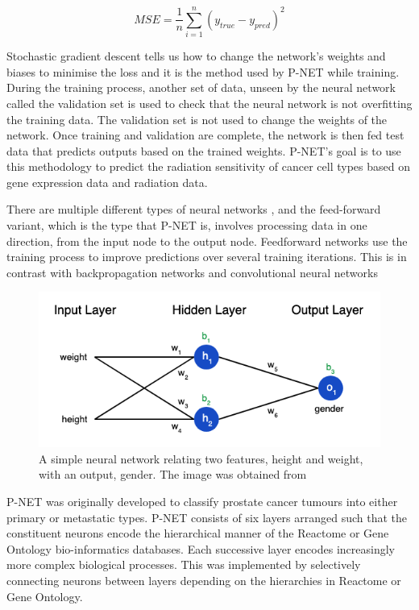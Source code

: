 \documentclass[NOTE, disdraft=true, UKenglish]{\DISCDTLATEXPATH UCLCDTDISdoc}
\begin{document}
\begin{equation}
    MSE = \frac{1}{n} \sum_{i=1}^{n} (y_{true} - y_{pred})^{2}
    \label{eq:mse}
\end{equation}

Stochastic gradient descent \cite{noauthor_what_nodate, elmarakeby_biologically_2021} tells us how to change the network's weights and biases to minimise the loss and it is the method used by P-NET while training. During the training process, another set of data, unseen by the neural network called the validation set is used to check that the neural network is not overfitting the training data. The validation set is not used to change the weights of the network. Once training and validation are complete, the network is then fed test data that predicts outputs based on the trained weights. P-NET's goal is to use this methodology to predict the radiation sensitivity of cancer cell types based on gene expression data and radiation data.

There are multiple different types of neural networks \cite{noauthor_what_nodate}, and the feed-forward variant, which is the type that P-NET is, involves processing data in one direction, from the input node to the output node. Feedforward networks use the training process to improve predictions over several training iterations. This is in contrast with backpropagation networks and convolutional neural networks

\begin{figure}
    \centering
    \includegraphics[width=\linewidth]{Figures/basicNN2.png}
    \caption{A simple neural network relating two features, height and weight, with an output, gender. The image was obtained from \cite{noauthor_machine_nodate}}
    \label{fig:basicNN}
\end{figure}

P-NET was originally developed to classify prostate cancer tumours into either primary or metastatic types. P-NET consists of six layers arranged such that the constituent neurons encode the hierarchical manner of the Reactome or Gene Ontology bio-informatics databases. Each successive layer encodes increasingly more complex biological processes. This was implemented by selectively connecting neurons between layers depending on the hierarchies in Reactome or Gene Ontology.
\end{document}
